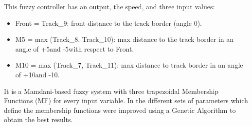 \documentclass[conference]{IEEEtran}
\begin{document}
This fuzzy controller has an output, the speed, and three input values:
\begin{itemize}
	\item Front = Track\_9: front distance to the track border (angle 0\textdegree).  
	\item M5 = max (Track\_8, Track\_10): max distance to the track border in an angle of +5\textdegree and -5\textdegree with respect to Front.
	\item M10 = max (Track\_7, Track\_11): max distance to track border in an angle of +10\textdegree and -10\textdegree.
\end{itemize}

It is a Mamdani-based fuzzy system \cite{iancu2012} with three
trapezoidal Membership Functions (MF) for every input variable. 
In \cite{evo18} the different sets of parameters which define the membership functions were improved using a Genetic Algorithm to obtain the best results.


\end{document}
